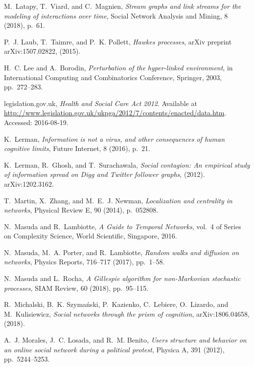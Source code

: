\documentclass[journal,transmag]{IEEEtran}
\begin{document}
\begin{thebibliography}{10}
{\sc M.~Latapy, T.~Viard, and C.~Magnien}, {\em Stream graphs and link streams
  for the modeling of interactions over time}, Social Network Analysis and
  Mining, 8 (2018), p.~61.

{\sc P.~J. Laub, T.~Taimre, and P.~K. Pollett}, {\em {H}awkes processes}, arXiv
  preprint arXiv:1507.02822,  (2015).

{\sc H.~C. Lee and A.~Borodin}, {\em Perturbation of the hyper-linked
  environment}, in International Computing and Combinatorics Conference,
  Springer, 2003, pp.~272--283.

{\sc legislation.gov.uk}, {\em {Health and Social Care Act 2012}}.
\newblock Available at
  \url{http://www.legislation.gov.uk/ukpga/2012/7/contents/enacted/data.htm}.
\newblock Accessed: 2016-08-19.

{\sc K.~Lerman}, {\em Information is not a virus, and other consequences of
  human cognitive limits}, Future Internet, 8 (2016), p.~21.

{\sc K.~Lerman, R.~Ghosh, and T.~Surachawala}, {\em Social contagion: {A}n
  empirical study of information spread on {D}igg and {T}witter follower
  graphs},  (2012).
\newblock arXiv:1202.3162.

{\sc T.~Martin, X.~Zhang, and M.~E.~J. Newman}, {\em Localization and
  centrality in networks}, Physical Review E, 90 (2014), p.~052808.

{\sc N.~Masuda and R.~Lambiotte}, {\em A Guide to Temporal Networks}, vol.~4 of
  Series on Complexity Science, World Scientific, Singapore, 2016.

{\sc N.~Masuda, M.~A. Porter, and R.~Lambiotte}, {\em Random walks and
  diffusion on networks}, Physics Reports, 716--717 (2017), pp.~1--58.

{\sc N.~Masuda and L.~Rocha}, {\em A {G}illespie algorithm for non-{M}arkovian
  stochastic processes}, SIAM Review, 60 (2018), pp.~95--115.

{\sc R.~Michalski, B.~K. Szyma\'{n}ski, P.~Kazienko, C.~Lebiere, O.~Lizardo,
  and M.~Kulisiewicz}, {\em Social networks through the prism of cognition},
  arXiv:1806.04658,  (2018).

{\sc A.~J. Morales, J.~C. Losada, and R.~M. Benito}, {\em Users structure and
  behavior on an online social network during a political protest}, Physica A,
  391 (2012), pp.~5244--5253.


\end{thebibliography}
\end{document}
